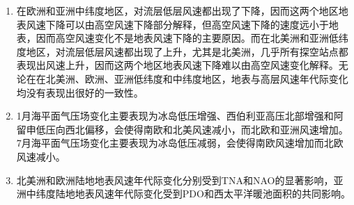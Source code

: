 \begin{enumerate}

\item 在欧洲和亚洲中纬度地区，对流层低层风速都出现了下降，因而这两个地区地表风速下降可以由高空风速下降部分解释，但高空风速下降的速度远小于地表，因而高空风速变化不是地表风速下降的主要原因。而在北美洲和亚洲低纬度地区，对流层低层风速都出现了上升，尤其是北美洲，几乎所有探空站点都表现出风速上升，因而这两个地区地表风速下降难以由高空风速变化解释。无论在在北美洲、欧洲、亚洲低纬度和中纬度地区，地表与高层风速年代际变化均没有表现出很好的一致性。

\item 1月海平面气压场变化主要表现为冰岛低压增强、西伯利亚高压北部增强和阿留申低压向西北偏移，会使得南欧和北美风速减小，而北欧和亚洲风速增加。7月海平面气压场变化主要表现为冰岛低压减弱，会使得南欧风速增加而北欧风速减小。

\item 北美洲和欧洲陆地地表风速年代际变化分别受到TNA和NAO的显著影响，亚洲中纬度陆地地表风速年代际变化受到PDO和西太平洋暖池面积的共同影响。

\end{enumerate}